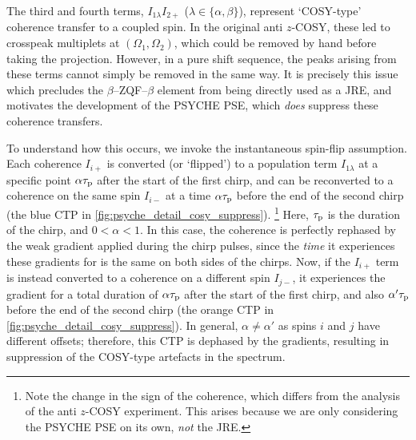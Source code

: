 The third and fourth terms, $I_{1\lambda}I_{2+}$ ($\lambda \in \{\alpha,\beta\}$), represent `COSY-type' coherence transfer to a coupled spin.
In the original anti $z$-COSY, these led to crosspeak multiplets at $(\Omega_1, \Omega_2)$, which could be removed by hand before taking the projection.
However, in a pure shift sequence, the peaks arising from these terms cannot simply be removed in the same way.
It is precisely this issue which precludes the $\beta$--ZQF--$\beta$ element from being directly used as a JRE, and motivates the development of the PSYCHE PSE, which \textit{does} suppress these coherence transfers.

To understand how this occurs, we invoke the instantaneous spin-flip assumption.
Each coherence $I_{i+}$ is converted (or `flipped') to a population term $I_{1\lambda}$ at a specific point $\alpha\tau_\mathrm{p}$ after the start of the first chirp, and can be reconverted to a coherence on the same spin $I_{i-}$ at a time $\alpha\tau_\mathrm{p}$ before the end of the second chirp (the blue CTP in \cref{fig:psyche_detail_cosy_suppress}).%
\footnote{Note the change in the sign of the coherence, which differs from the analysis of the anti $z$-COSY experiment. This arises because we are only considering the PSYCHE PSE on its own, \textit{not} the JRE.}
Here, $\tau_\mathrm{p}$ is the duration of the chirp, and $0 < \alpha < 1$.
In this case, the coherence is perfectly rephased by the weak gradient applied during the chirp pulses, since the \textit{time} it experiences these gradients for is the same on both sides of the chirps.
Now, if the $I_{i+}$ term is instead converted to a coherence on a different spin $I_{j-}$, it experiences the gradient for a total duration of $\alpha\tau_\mathrm{p}$ after the start of the first chirp, and also $\alpha'\tau_\mathrm{p}$ before the end of the second chirp (the orange CTP in \cref{fig:psyche_detail_cosy_suppress}).
In general, $\alpha \neq \alpha'$ as spins $i$ and $j$ have different offsets; therefore, this CTP is dephased by the gradients, resulting in suppression of the COSY-type artefacts in the spectrum.

